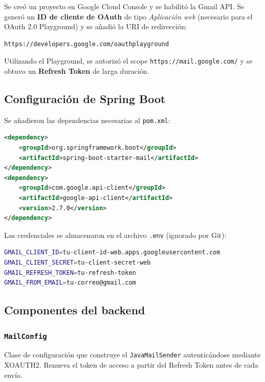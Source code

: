 Se creó un proyecto en Google Cloud Console y se habilitó la Gmail API. Se generó un \textbf{ID de cliente de OAuth} de tipo \textit{Aplicación web} (necesario para el OAuth 2.0 Playground) y se añadió la URI de redirección:

\begin{lstlisting}[language=bash]
https://developers.google.com/oauthplayground
\end{lstlisting}

Utilizando el Playground, se autorizó el scope \texttt{https://mail.google.com/} y se obtuvo un \textbf{Refresh Token} de larga duración.

\subsection{Configuración de Spring Boot}

Se añadieron las dependencias necesarias al \texttt{pom.xml}:

\begin{lstlisting}[language=XML]
<dependency>
    <groupId>org.springframework.boot</groupId>
    <artifactId>spring-boot-starter-mail</artifactId>
</dependency>
<dependency>
    <groupId>com.google.api-client</groupId>
    <artifactId>google-api-client</artifactId>
    <version>2.7.0</version>
</dependency>
\end{lstlisting}

Las credenciales se almacenaron en el archivo \texttt{.env} (ignorado por Git):

\begin{lstlisting}[language=bash]
GMAIL_CLIENT_ID=tu-client-id-web.apps.googleusercontent.com
GMAIL_CLIENT_SECRET=tu-client-secret-web
GMAIL_REFRESH_TOKEN=tu-refresh-token
GMAIL_FROM_EMAIL=tu-correo@gmail.com
\end{lstlisting}

\subsection{Componentes del backend}

\subsubsection{\texttt{MailConfig}}

Clase de configuración que construye el \texttt{JavaMailSender} autenticándose mediante XOAUTH2. Renueva el token de acceso a partir del Refresh Token antes de cada envío.

